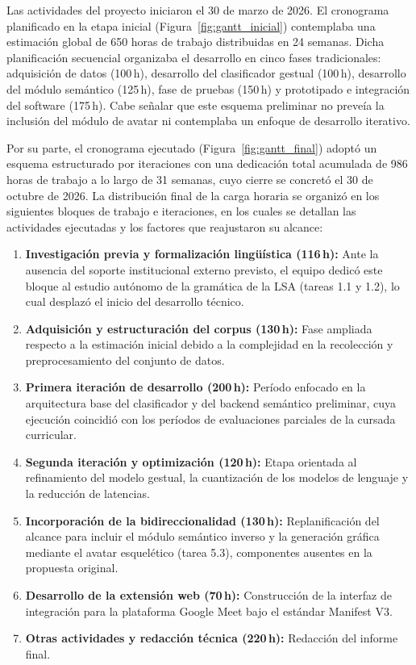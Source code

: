 Las actividades del proyecto iniciaron el 30 de marzo de 2026. El cronograma planificado en la etapa inicial (Figura~\ref{fig:gantt_inicial}) contemplaba una estimación global de 650 horas de trabajo distribuidas en 24 semanas. Dicha planificación secuencial organizaba el desarrollo en cinco fases tradicionales: adquisición de datos (100\,h), desarrollo del clasificador gestual (100\,h), desarrollo del módulo semántico (125\,h), fase de pruebas (150\,h) y prototipado e integración del software (175\,h). Cabe señalar que este esquema preliminar no preveía la inclusión del módulo de avatar ni contemplaba un enfoque de desarrollo iterativo.

Por su parte, el cronograma ejecutado (Figura~\ref{fig:gantt_final}) adoptó un esquema estructurado por iteraciones con una dedicación total acumulada de 986 horas de trabajo a lo largo de 31 semanas, cuyo cierre se concretó el 30 de octubre de 2026. La distribución final de la carga horaria se organizó en los siguientes bloques de trabajo e iteraciones, en los cuales se detallan las actividades ejecutadas y los factores que reajustaron su alcance:

\begin{enumerate}
    \item \textbf{Investigación previa y formalización lingüística (116\,h):} Ante la ausencia del soporte institucional externo previsto, el equipo dedicó este bloque al estudio autónomo de la gramática de la LSA (tareas 1.1 y 1.2), lo cual desplazó el inicio del desarrollo técnico.
    
    \item \textbf{Adquisición y estructuración del corpus (130\,h):} Fase ampliada respecto a la estimación inicial debido a la complejidad en la recolección y preprocesamiento del conjunto de datos.
    
    \item \textbf{Primera iteración de desarrollo (200\,h):} Período enfocado en la arquitectura base del clasificador y del backend semántico preliminar, cuya ejecución coincidió con los períodos de evaluaciones parciales de la cursada curricular.
    
    \item \textbf{Segunda iteración y optimización (120\,h):} Etapa orientada al refinamiento del modelo gestual, la cuantización de los modelos de lenguaje y la reducción de latencias.
    
    \item \textbf{Incorporación de la bidireccionalidad (130\,h):} Replanificación del alcance para incluir el módulo semántico inverso y la generación gráfica mediante el avatar esquelético (tarea 5.3), componentes ausentes en la propuesta original.
    
    \item \textbf{Desarrollo de la extensión web (70\,h):} Construcción de la interfaz de integración para la plataforma Google Meet bajo el estándar Manifest V3.
    
    \item \textbf{Otras actividades y redacción técnica (220\,h):} Redacción del informe final.
\end{enumerate}

